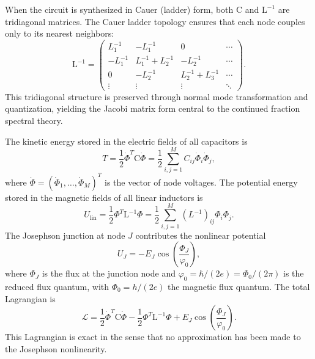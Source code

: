 \documentclass[reprint, floatfix, superscriptaddress, amsmath, amssymb, longbibliography]{revtex4-2}
\begin{document}
When the circuit is synthesized in Cauer (ladder) form, both $\mathrm{C}$ and $\mathrm{L}^{-1}$ are tridiagonal matrices. The Cauer ladder topology ensures that each node couples only to its nearest neighbors:
\begin{equation}
\mathrm{L}^{-1} = \begin{pmatrix}
L_1^{-1} & -L_1^{-1} & 0 & \cdots \\
-L_1^{-1} & L_1^{-1} + L_2^{-1} & -L_2^{-1} & \cdots \\
0 & -L_2^{-1} & L_2^{-1} + L_3^{-1} & \cdots \\
\vdots & \vdots & \vdots & \ddots
\end{pmatrix}.
\label{eq:L_inv_tridiagonal}
\end{equation}
This tridiagonal structure is preserved through normal mode transformation and quantization, yielding the Jacobi matrix form central to the continued fraction spectral theory.

The kinetic energy stored in the electric fields of all capacitors is
\begin{equation}
T = \frac{1}{2} \dot{{\Phi}}^T \mathrm{C} \dot{{\Phi}} = \frac{1}{2} \sum_{i,j=1}^{M} C_{ij} \dot{\Phi}_i \dot{\Phi}_j,
\label{eq:kinetic_energy}
\end{equation}
where $\dot{{\Phi}} = (\dot{\Phi}_1, \ldots, \dot{\Phi}_M)^T$ is the vector of node voltages. The potential energy stored in the magnetic fields of all linear inductors is
\begin{equation}
U_{\mathrm{lin}} = \frac{1}{2} {\Phi}^T \mathrm{L}^{-1} {\Phi} = \frac{1}{2} \sum_{i,j=1}^{M} (L^{-1})_{ij} \Phi_i \Phi_j.
\label{eq:linear_potential}
\end{equation}
The Josephson junction at node $J$ contributes the nonlinear potential
\begin{equation}
U_J = -E_J \cos\left(\frac{\Phi_J}{\varphi_0}\right),
\label{eq:junction_potential}
\end{equation}
where $\Phi_J$ is the flux at the junction node and $\varphi_0 = \hbar/(2e) = \Phi_0/(2\pi)$ is the reduced flux quantum, with $\Phi_0 = h/(2e)$ the magnetic flux quantum. The total Lagrangian is
\begin{equation}
\mathcal{L} = \frac{1}{2}\dot{{\Phi}}^T \mathrm{C} \dot{{\Phi}} - \frac{1}{2}{\Phi}^T \mathrm{L}^{-1} {\Phi} + E_J \cos\left(\frac{\Phi_J}{\varphi_0}\right).
\label{eq:lagrangian}
\end{equation}
This Lagrangian is exact in the sense that no approximation has been made to the Josephson nonlinearity.
\end{document}
